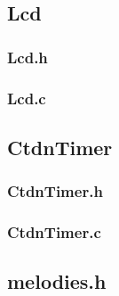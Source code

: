 \documentclass[fleqn]{article}
\begin{document}
\pagebreak

\subsection{Lcd}

\noindent\begin{minipage}[t]{.45\textwidth}
	\subsubsection{Lcd.h}
	
\end{minipage}\hfill
\noindent\begin{minipage}[t]{.45\textwidth}
	\subsubsection{Lcd.c}
	
\end{minipage}\hfill

\pagebreak

\noindent\begin{minipage}[t]{.45\textwidth}
\subsection{CtdnTimer}
\subsubsection{CtdnTimer.h}

\subsubsection{CtdnTimer.c}

\end{minipage}\hfill
\noindent\begin{minipage}[t]{.45\textwidth}
\subsection{melodies.h}

\end{minipage}\hfill

\pagebreak
\end{document}
